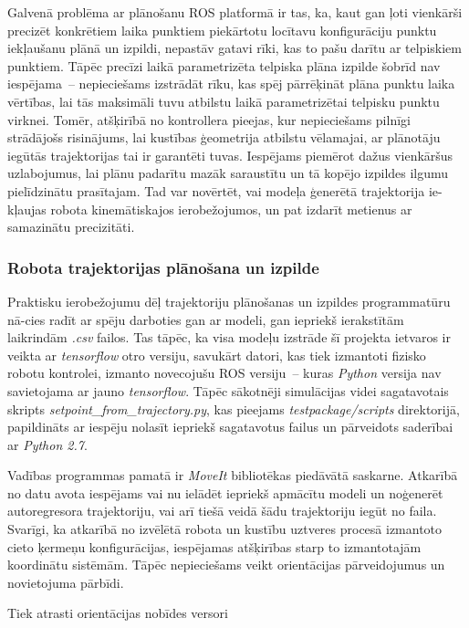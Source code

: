 \documentclass[12pt, a4paper]{article}
\numberwithin{equation}{section} %
\begin{document}
Galvenā problēma ar plānošanu ROS platformā ir tas, ka, kaut gan ļoti vienkārši precizēt konkrētiem laika punktiem piekārtotu locītavu konfigurāciju punktu iekļaušanu plānā un izpildi, nepastāv gatavi rīki, kas to pašu darītu ar telpiskiem punktiem. Tāpēc precīzi laikā parametrizēta telpiska plāna izpilde šobrīd nav iespējama~-- nepieciešams izstrādāt rīku, kas spēj pārrēķināt plāna punktu laika vērtības, lai tās maksimāli tuvu atbilstu laikā parametrizētai telpisku punktu virknei. Tomēr, atšķirībā no kontrollera pieejas, kur nepieciešams pilnīgi strādājošs risinājums, lai kustības ģeometrija atbilstu vēlamajai, ar plānotāju iegūtās trajektorijas tai ir garantēti tuvas. Iespējams piemērot dažus vienkāršus uzlabojumus, lai plānu padarītu mazāk saraustītu un tā kopējo izpildes ilgumu pielīdzinātu prasītajam. Tad var novērtēt, vai modeļa ģenerētā trajektorija ie-kļaujas robota kinemātiskajos ierobežojumos, un pat izdarīt metienus ar samazinātu precizitāti.

\subsubsection{Robota trajektorijas plānošana un izpilde}


Praktisku ierobežojumu dēļ trajektoriju plānošanas un izpildes programmatūru nā-cies radīt ar spēju darboties gan ar modeli, gan iepriekš ierakstītām laikrindām \textit{.csv} failos. Tas tāpēc, ka visa modeļu izstrāde šī projekta ietvaros ir veikta ar \textit{tensorflow} otro versiju, savukārt datori, kas tiek izmantoti fizisko robotu kontrolei, izmanto novecojušu ROS versiju~-- kuras \textit{Python} versija nav savietojama ar jauno \textit{tensorflow}. Tāpēc sākotnēji simulācijas videi sagatavotais skripts \textit{setpoint\_from\_trajectory.py}, kas pieejams \textit{testpackage/scripts} direktorijā, papildināts ar iespēju nolasīt iepriekš sagatavotus failus un pārveidots saderībai ar \textit{Python 2.7}.

Vadības programmas pamatā ir \textit{MoveIt} bibliotēkas piedāvātā saskarne. Atkarībā no datu avota iespējams vai nu ielādēt iepriekš apmācītu modeli un noģenerēt autoregresora trajektoriju, vai arī tiešā veidā šādu trajektoriju iegūt no faila. Svarīgi, ka atkarībā no izvēlētā robota un kustību uztveres procesā izmantoto cieto ķermeņu konfigurācijas, iespējamas atšķirības starp to izmantotajām koordinātu sistēmām. Tāpēc nepieciešams veikt orientācijas pārveidojumus un novietojuma pārbīdi.

Tiek atrasti orientācijas nobīdes versori
\end{document}
